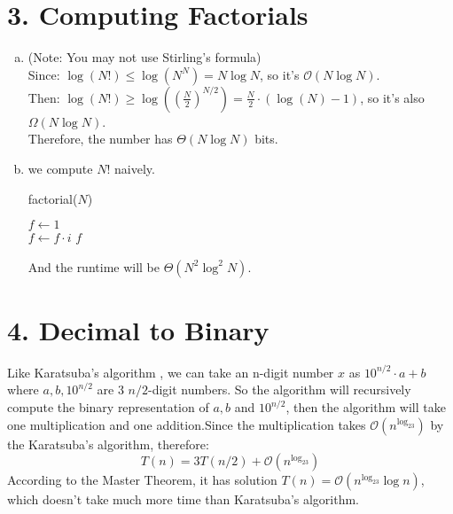 \documentclass[11pt]{article}
\newenvironment{qparts}{\begin{enumerate}[(a)]}{\end{enumerate}}
\begin{document}
	\section*{3. Computing Factorials}
	\begin{qparts}
		\item (Note: You may not use Stirling’s formula)\\
		Since: $\log(N!) \leq \log (N^N) = N\log N $, so it's $\mathcal{O}(N\log N)$.\\
		Then: $\log(N!) \geq \log((\frac{N}{2})^{N/2}) = \frac{N}{2}\cdot (\log(N)-1)$, so it's also $\Omega(N\log N)$.\\
		Therefore, the number has $\Theta(N\log N)$ bits.
		
		\item 
		we compute  $N!$ naively.\\
		\begin{algorithm}[H] 
			\caption{factorial($N$)}
			$f \leftarrow 1$\\
			{
				$f \leftarrow f \cdot i$
			}
			\Return $f$ 
		\end{algorithm}
		And the runtime will be $\Theta(N^2\log^2 N)$.
	\end{qparts}
	
	\vspace{0.7cm}
	
	\section*{4. Decimal to Binary}
	Like Karatsuba's algorithm , we can take an n-digit number $x$ as $10^{n/2} \cdot a + b$ where $a, b, 10^{n/2}$ are 3 $n/2$-digit numbers. So the algorithm will recursively compute the binary representation of $a, b$ and $10^{n/2}$, then the algorithm will take one multiplication and one addition.Since the multiplication takes $\mathcal{O}(n^{\log_23}) $ by the Karatsuba's algorithm, therefore:
	$$T(n) = 3T(n/2) + \mathcal{O}(n^{\log_23})$$
	According to the Master Theorem, it has solution $T(n) = \mathcal{O}(n^{\log_23}\log n)$, which doesn't take much more time than Karatsuba's algorithm.
	
	\vspace{0.7cm}
	
\end{document}

